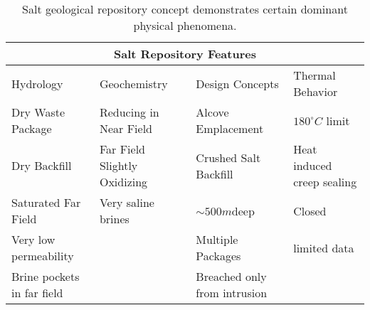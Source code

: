 %
\begin{table}[h!]
  \centering
  \footnotesize{
  \begin{tabular}{|l|l|l|l|}
    \multicolumn{4}{c}{\textbf{Salt Repository Features}}\\
    \hline
    Hydrology & Geochemistry & Design Concepts & Thermal Behavior \\ 
    \hline
    Dry Waste Package & Reducing in Near Field & Alcove Emplacement & $180^\circ C$ limit \cite{von_lensa_red-impact_2008} \\
    Dry Backfill &Far Field Slightly Oxidizing &Crushed Salt Backfill & Heat induced creep sealing\\
    Saturated Far Field& Very saline brines  &$\sim500m$deep & Closed \\
    Very low permeability &  & Multiple Packages &limited data\\
    Brine pockets in far field&&Breached only from intrusion&\\
    \hline
  \end{tabular}
  \caption[Salt Repository Features]{Salt geological repository 
  concept demonstrates certain dominant physical phenomena. }
  \label{tab:salt_tab}
  }
\end{table}





